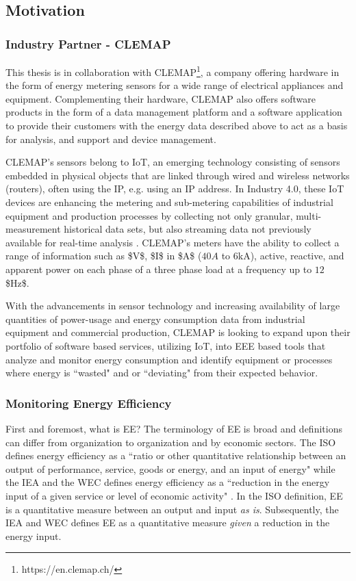 \subsection{Motivation}

\subsubsection{Industry Partner - CLEMAP}
This thesis is in collaboration with \ac{CLEMAP}\footnote[1]{https://en.clemap.ch/}, a company offering hardware in the form of energy metering sensors for a wide range of electrical appliances and equipment. Complementing their hardware, CLEMAP also offers software products in the form of a data management platform and a software application to provide their customers with the energy data described above to act as a basis for analysis, and support and device management.

CLEMAP’s sensors belong to \ac{IoT}, an emerging technology consisting of sensors embedded in physical objects that are linked through wired and wireless networks (routers), often using the \ac{IP}, e.g. using an IP address. In Industry 4.0, these IoT devices are enhancing the metering and sub-metering capabilities of industrial equipment and production processes by collecting not only granular, multi-measurement historical data sets, but also streaming data not previously available for real-time analysis \cite{iot-1}. CLEMAP's meters have the ability to collect a range of information such as \ac{$V$}, \ac{$I$} in \ac{$A$} ($40$$A$ to $6$kA), active, reactive, and apparent power on each phase of a three phase load at a frequency up to $12$ \ac{$Hz$}. 

With the advancements in sensor technology and increasing availability of large quantities of power-usage and energy consumption data from industrial equipment and commercial production, CLEMAP is looking to expand upon their portfolio of software based services, utilizing IoT, into \ac{EEE} based tools that analyze and monitor energy consumption and identify equipment or processes where energy is ``wasted" and or ``deviating" from their expected behavior.

\subsubsection{Monitoring Energy Efficiency}

First and foremost, what is \ac{EE}? The terminology of EE is broad and definitions can differ from organization to organization and by economic sectors. The \ac{ISO} defines energy efficiency as a ``ratio or other quantitative relationship between an output of performance, service, goods or energy, and an input of energy" \cite{ISO} while the \ac{IEA} and the \ac{WEC} defines energy efficiency as a ``reduction in the energy input of a given service or level of economic activity" \cite{iea-wec}. In the ISO definition, EE is a quantitative measure between an output and input \textit{as is}. Subsequently, the IEA and WEC defines EE as a quantitative measure \textit{given} a reduction in the energy input.

